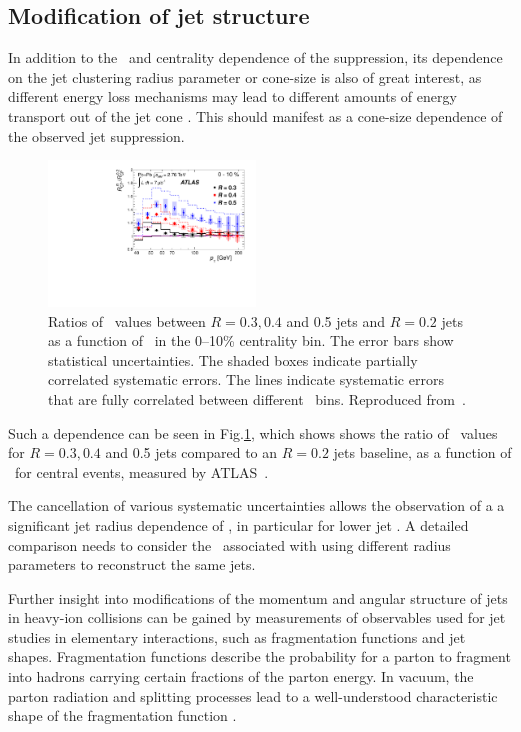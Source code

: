 \subsection{Modification of jet structure}

In addition to the \pT\ and centrality dependence of the suppression, its dependence on the 
jet clustering radius parameter or cone-size is also of great interest, as different energy loss 
mechanisms may lead to different amounts of energy transport out of the jet cone
\cite{Vitev:2008rz, Vitev:2009rd,He:2011pd}. This should manifest as a cone-size
dependence of the observed jet suppression.
\begin{figure}[!th]
\begin{center}
\includegraphics[width=0.49\textwidth]{jetfigures/ATLAS_jetRCP_size.pdf}
\caption{
Ratios of \Rcp\ values between $R = 0.3, 0.4$ and 0.5 jets and $R =
0.2$ jets as a function of \pT\ in the 0--10\% centrality bin. The
error bars show statistical uncertainties. The shaded boxes
indicate partially correlated systematic errors. The lines indicate
systematic errors that are fully correlated between different \pT\ bins.
Reproduced from~\cite{Aad:2012is}.
}
\label{fig:GR:ATLAS_jetRCP_size}
\end{center}
\end{figure}

Such a dependence can be seen in Fig.\ref{fig:GR:ATLAS_jetRCP_size}, which shows
shows the ratio of \Rcp\ values for $R = 0.3, 0.4$ and 0.5 jets compared
to an $R = 0.2$ jets baseline, as a function of \pT\ for central events,
measured by ATLAS~\cite{Aad:2012is}.

The cancellation of various systematic uncertainties allows the observation of a
a significant jet radius dependence of \Rcp, in particular for
lower jet \pT. A detailed comparison needs to consider the \pT\ associated with
using different radius parameters to reconstruct the same jets.

Further insight into modifications of the momentum and angular structure
of jets in heavy-ion collisions can be gained by measurements of
observables used for jet studies in elementary interactions, such as
fragmentation functions and jet shapes.
Fragmentation functions describe the probability for a parton to fragment into
hadrons carrying certain fractions of the parton energy.
In vacuum, the parton radiation and splitting processes lead to a
well-understood characteristic shape of the fragmentation function \cite{Dokshitzer:1991wu}.

